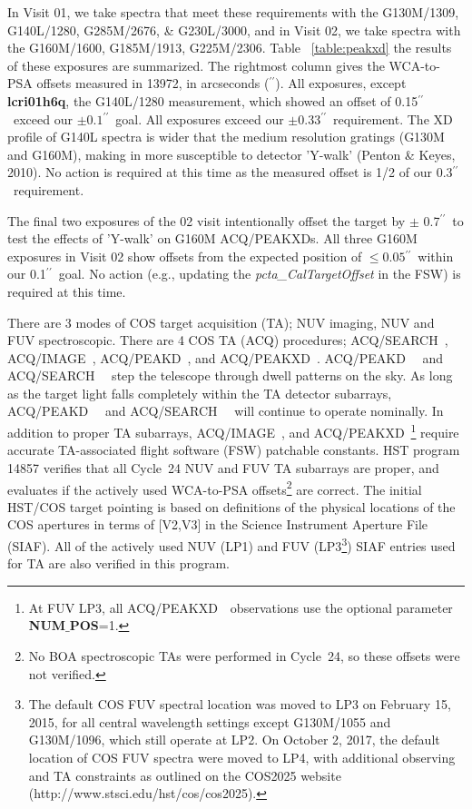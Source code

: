 \documentclass[12pt]{reportj}
\def\arcsec{\hbox{$^{\prime\prime}$}}
\newcommand*{\myfont}{\fontfamily{rm}\selectfont}
\def\numpos{{\bf NUM$\_$POS}\rm}
\def\acqimage{{\myfont ACQ/IMAGE}\rm~}
\def\acqsearch{{\myfont ACQ/SEARCH}\rm~}
\def\acqpeakd{{\myfont ACQ/PEAKD}\rm~}
\def\acqpeakxd{{\myfont ACQ/PEAKXD}\rm~}
\begin{document}
In Visit 01, we take spectra that meet these requirements with the G130M/1309, G140L/1280, G285M/2676, \& G230L/3000, and in Visit 02,
we take spectra with the G160M/1600, G185M/1913, G225M/2306. Table ~\ref{table:peakxd} the results of these exposures are summarized.
The rightmost column gives the WCA-to-PSA offsets measured in 13972, in arcseconds (\arcsec).
All exposures, except {\bf lcri01h6q}, the G140L/1280 measurement, which showed an offset of 0.15\arcsec\ exceed our $\pm 0.1$\arcsec\ goal.
All exposures exceed our $\pm 0.33$\arcsec\ requirement. The XD profile of G140L spectra is wider that the medium
resolution gratings (G130M and G160M), making in more susceptible to detector 'Y-walk' (Penton \& Keyes, 2010).
No action is required at this time as the measured offset is 1/2 of our 0.3\arcsec\ requirement.

The final two exposures of the 02 visit intentionally offset the target by $\pm$ 0.7\arcsec\ to test the effects
of 'Y-walk' on G160M ACQ/PEAKXDs. All three G160M exposures in Visit 02 show offsets from the expected position
of $\le 0.05$\arcsec\ within our 0.1\arcsec\ goal. No action (e.g., updating the {\it pcta\_CalTargetOffset} in the FSW)
is required at this time.
%
\clearpage

\clearpage

\clearpage

\clearpage

There are 3 modes of COS target acquisition (TA); NUV imaging, NUV and FUV spectroscopic.
There are 4 COS TA (ACQ) procedures; \acqsearch, \acqimage, \acqpeakd, and \acqpeakxd. \acqpeakd~ and \acqsearch~ step the telescope through dwell patterns on the sky. As long as the target light falls completely within
the TA detector subarrays, \acqpeakd~ and \acqsearch~ will continue to operate nominally.
In addition to proper TA subarrays, \acqimage, and \acqpeakxd \footnote{At FUV LP3, all \acqpeakxd~observations use the optional parameter \numpos=1.} require accurate TA-associated flight software (FSW) patchable constants.
HST program 14857 verifies that all Cycle~24 NUV and FUV TA subarrays are proper, and evaluates if the actively used WCA-to-PSA offsets\footnote{No BOA spectroscopic TAs were performed in Cycle~24, so these offsets were not verified.} are correct.
The initial HST/COS target pointing is based on definitions of the physical locations of the COS apertures in terms of [V2,V3] in the Science Instrument Aperture File (SIAF).
All of the actively used NUV (LP1) and FUV (LP3\footnote{The default COS FUV spectral location was moved to LP3 on February 15, 2015, for all central wavelength settings except G130M/1055 and G130M/1096, which still operate at LP2. On October 2, 2017, the default location of COS FUV spectra were moved to LP4, with additional observing and TA constraints as outlined on the COS2025 website (http://www.stsci.edu/hst/cos/cos2025).}) SIAF entries used for TA are also verified in this program.
\end{document}
